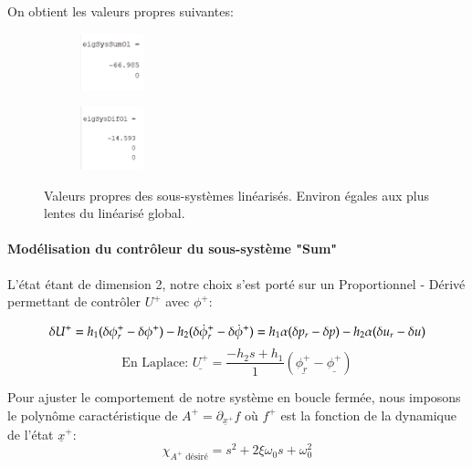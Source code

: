 \documentclass{report}
\begin{document}
On obtient les valeurs propres suivantes:

\begin{figure}[h]  %
    \begin{subfigure}{.5\textwidth}
        \centering
        \includegraphics[width=0.2\textwidth]{figures/eigSysSumOl.png}        
      \end{subfigure}    
      \begin{subfigure}{.5\textwidth}
        \centering
        \includegraphics[width=0.2\textwidth]{figures/eigSysDifOl.png}
      \end{subfigure}    
      \caption{Valeurs propres des sous-systèmes linéarisés. 
      Environ égales aux plus lentes du linéarisé global.}
\end{figure}

\paragraph{Modélisation du contrôleur du sous-système "Sum"}

L'état étant de dimension 2, notre choix s'est porté sur un Proportionnel
- Dérivé permettant de contrôler $U^+$ avec $\phi^+$:

\begin{equation*}
    \delta{U^+} = h_1(\delta \phi^+_r - \delta \phi^+) 
    - h_2(\delta \dot{\phi}^+_r - \delta \dot{\phi}^+) \\     
    =h_1\alpha( \delta p_r - \delta p) 
    - h_2\alpha( \delta u_r - \delta u)
\end{equation*}
\begin{equation*}
    \text{En Laplace: }
    \underline{U^+} = \frac{-h_2s + h_1}{1}
    (\underline{\phi^+_r} -\underline{\phi^+})
\end{equation*}

Pour ajuster le comportement de notre système en boucle fermée, nous 
imposons le polynôme caractéristique de $A^+ = \partial_{\underline{x}^+} f$
où $f^+$ est la fonction de la dynamique de l'état $\underline{x}^+$:
\begin{equation*}
    \chi_{A^+ \text{ désiré}} = s^2 + 2\xi\omega_0 s + \omega_0^2
\end{equation*}
\end{document}
